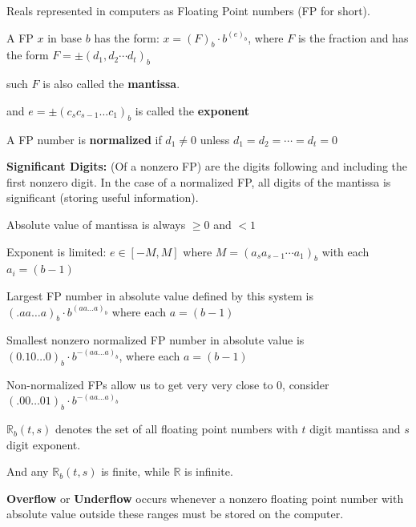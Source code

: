 \documentclass{article}
\begin{document}
Reals represented in computers as Floating Point numbers (FP for short).

A FP $x$ in base $b$ has the form: $x = (F)_b \cdot b^{(e)_b}$, where $F$ is the fraction and has the form $F = \pm (d_1, d_2 \cdots d_t)_b$

such $F$ is also called the \textbf{mantissa}.

and $e = \pm (c_s c_{s - 1} \dots c_1)_b$ is called the \textbf{exponent}

\vspace{0.2cm}

A FP number is \textbf{normalized} if $d_1 \neq 0$ unless $d_1 = d_2 = \cdots = d_t = 0$

\vspace{0.2cm}

\textbf{Significant Digits:} (Of a nonzero FP) are the digits following and including the first nonzero digit. In the case of a normalized FP, all digits of the mantissa is significant (storing useful information). 

\vspace{0.2cm}

Absolute value of mantissa is always $\geq 0$ and $< 1$

Exponent is limited: $e \in [-M, M]$ where $M = (a_s a_{s - 1} \cdots a_1)_b$ with each $a_i = (b - 1)$

\vspace{0.2cm}

Largest FP number in absolute value defined by this system is $(.a a \dots a)_{b} \cdot b^{(a a \dots a)_b}$ where each $a = (b - 1)$

Smallest nonzero normalized FP number in absolute value is $(0.10 \dots 0)_b \cdot b^{-(a a \dots a)_b}$, where each $a = (b - 1)$

Non-normalized FPs allow us to get very very close to 0, consider $(.00 \dots 0 1)_b \cdot b^{-(aa\dots a)_b}$

\vspace{0.2cm}

$\mathbb R_b(t,s)$ denotes the set of all floating point numbers with $t$ digit mantissa and $s$ digit exponent.

And any $\mathbb R_b(t,s)$ is finite, while $\mathbb R$ is infinite.

\vspace{0.2cm}

\textbf{Overflow} or \textbf{Underflow} occurs whenever a nonzero floating point number with absolute value outside these ranges must be stored on the computer.
\end{document}
